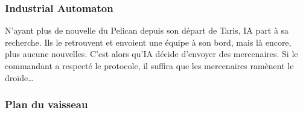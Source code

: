 \vspace{10\baselineskip}
\subsubsection{Industrial Automaton}
N’ayant plus de nouvelle du Pelican depuis son départ de Taris, IA part à sa recherche. Ils le retrouvent et envoient une équipe à son bord, mais là encore, plus aucune nouvelles. C’est alors qu’IA décide d’envoyer des mercenaires. Si le commandant a respecté le protocole, il suffira que les mercenaires ramènent le droïde\ldots

\onecolumn
\subsubsection{Plan du vaisseau}

